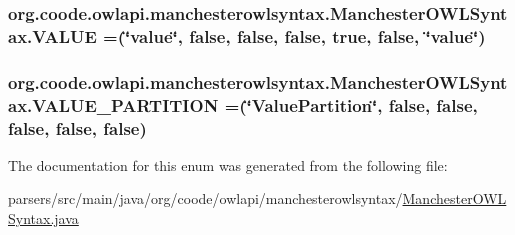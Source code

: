 \hypertarget{enumorg_1_1coode_1_1owlapi_1_1manchesterowlsyntax_1_1_manchester_o_w_l_syntax_a1290ac68479e2a22e88f263cc61156e6}{
\subsubsection[{V\-A\-L\-U\-E}]{\setlength{\rightskip}{0pt plus 5cm}org.\-coode.\-owlapi.\-manchesterowlsyntax.\-Manchester\-O\-W\-L\-Syntax.\-V\-A\-L\-U\-E =(\char`\"{}value\char`\"{}, false, false, false, true, false, \char`\"{}value\char`\"{})}}\label{enumorg_1_1coode_1_1owlapi_1_1manchesterowlsyntax_1_1_manchester_o_w_l_syntax_a1290ac68479e2a22e88f263cc61156e6}
\hypertarget{enumorg_1_1coode_1_1owlapi_1_1manchesterowlsyntax_1_1_manchester_o_w_l_syntax_a524fe1f5766519b172cdbf446b6dbaf2}{
\subsubsection[{V\-A\-L\-U\-E\-\_\-\-P\-A\-R\-T\-I\-T\-I\-O\-N}]{\setlength{\rightskip}{0pt plus 5cm}org.\-coode.\-owlapi.\-manchesterowlsyntax.\-Manchester\-O\-W\-L\-Syntax.\-V\-A\-L\-U\-E\-\_\-\-P\-A\-R\-T\-I\-T\-I\-O\-N =(\char`\"{}Value\-Partition\char`\"{}, false, false, false, false, false)}}\label{enumorg_1_1coode_1_1owlapi_1_1manchesterowlsyntax_1_1_manchester_o_w_l_syntax_a524fe1f5766519b172cdbf446b6dbaf2}


The documentation for this enum was generated from the following file\-:\begin{DoxyCompactItemize}
\item 
parsers/src/main/java/org/coode/owlapi/manchesterowlsyntax/\hyperlink{_manchester_o_w_l_syntax_8java}{Manchester\-O\-W\-L\-Syntax.\-java}\end{DoxyCompactItemize}
